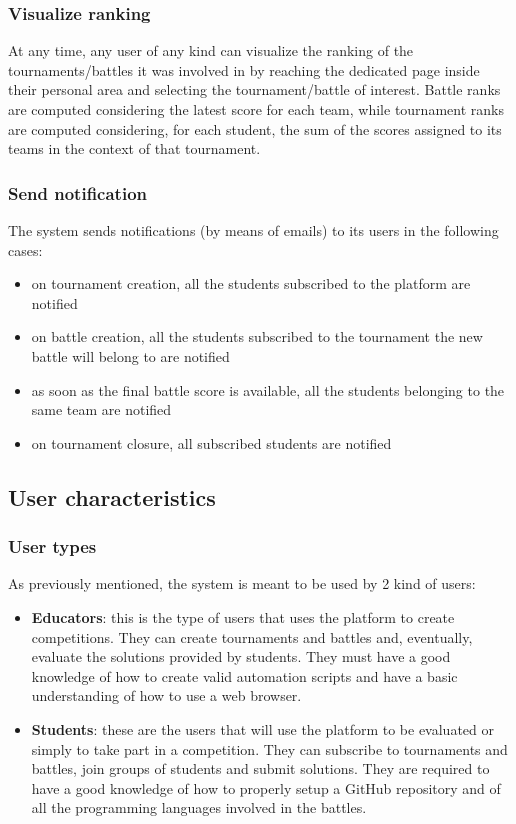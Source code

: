 \subsubsection{Visualize ranking}
At any time, any user of any kind can visualize the ranking of the tournaments/battles it was involved in by reaching the dedicated page inside their personal area and selecting the tournament/battle of interest. Battle ranks are computed considering the latest score for each team, while tournament ranks are computed considering, for each student, the sum of the scores assigned to its teams in the context of that tournament.
\subsubsection{Send notification}
The system sends notifications (by means of emails) to its users in the following cases:
\begin{itemize}
    \item on tournament creation, all the students subscribed to the platform are notified
    \item on battle creation, all the students subscribed to the tournament the new battle will belong to are notified
    \item as soon as the final battle score is available, all the students belonging to the same team are notified
    \item on tournament closure, all subscribed students are notified
\end{itemize}

\subsection{User characteristics}
\subsubsection{User types}
As previously mentioned, the system is meant to be used by 2 kind of users:
\begin{itemize}
    \item \textbf{Educators}: this is the type of users that uses the platform to create competitions. They can create tournaments and battles and, eventually, evaluate the solutions provided by students. They must have a good knowledge of how to create valid automation scripts and have a basic understanding of how to use a web browser.
    \item \textbf{Students}: these are the users that will use the platform to be evaluated or simply to take part in a competition. They can subscribe to tournaments and battles, join groups of students and submit solutions. They are required to have a good knowledge of how to properly setup a GitHub repository and of all the programming languages involved in the battles.
\end{itemize} 
